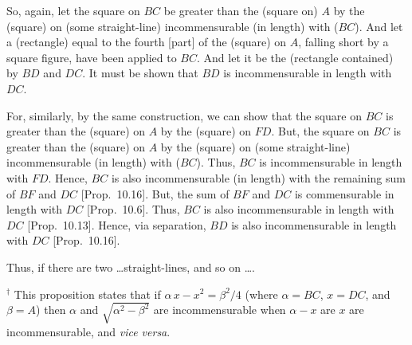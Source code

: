 \begin{Parallel}{}{}
{So, again, let the square on $BC$ be greater than the (square on) $A$ by
the (square) on (some straight-line) incommensurable (in length) with ($BC$). And let a (rectangle) equal to the fourth [part] of the (square) on  $A$, falling short by a
square figure, have been applied to $BC$.  And let it be the (rectangle contained) by $BD$ and $DC$. It must be shown that $BD$ is incommensurable in length with $DC$.

For, similarly, by the same construction, we can show that the square on $BC$ is greater than the (square) on $A$ by the (square) on $FD$. But,
the square on $BC$ is greater than the (square) on $A$ by the (square) on (some straight-line)
incommensurable (in length) with ($BC$). Thus, $BC$ is incommensurable in length with
$FD$. Hence, $BC$ is also incommensurable (in length) with the remaining sum of $BF$ and
$DC$ [Prop.~10.16]. But, the sum of
$BF$ and $DC$ is commensurable in length with $DC$ [Prop.~10.6]. Thus, $BC$ is also incommensurable
in length with $DC$ [Prop.~10.13]. Hence, via
separation, $BD$ is
also incommensurable in length with $DC$ [Prop.~10.16].

Thus,  if there are two \ldots straight-lines, and so on \ldots.}
\end{Parallel}
{\footnotesize\noindent$^\dag$ This proposition states that if $\alpha\,x-x^2=\beta^2/4$ (where $\alpha=BC$, $x=DC$,
and $\beta=A$) then $\alpha$ and $\sqrt{\alpha^2-\beta^2}$ are incommensurable when $\alpha-x$ are $x$ are incommensurable, and {\em vice versa}.}

